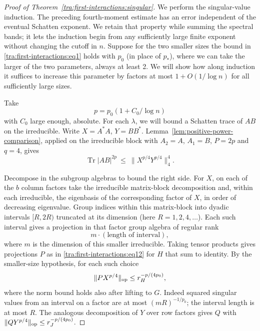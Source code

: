 \begin{proof}[Proof of Theorem~\ref{tra:first-interactions:singular}]

\label{tra:first-interactions:alt-and-dyadic-band-decay}
We perform the singular-value induction. The preceding fourth-moment estimate has an error independent of
the eventual Schatten exponent. We retain that property while summing
the spectral bands; it lets the induction begin from any sufficiently
large finite exponent without changing the cutoff in $n$. Suppose for the two smaller sizes the bound in \eqref{tra:first-interactions:eq1} holds with \(p_0\) (in place of \(p_*\)), where we can take the larger of the two parameters, always at least 2. We will show how along induction it suffices to increase this parameter by factors at most \(1+O(1/\log n)\) for all sufficiently large sizes.

Take
\[
                    p=p_0(1+C_0/\log n)
\]
with \(C_0\) large enough, absolute. For each \(\lambda\), we will bound a Schatten trace of \(A B\) on the irreducible. Write \(X=A^* A\), \(Y=B B^*\). Lemma~\ref{lem:positive-power-comparison}, applied on the
irreducible block with $A_2=A$, $A_1=B$, $P=2p$ and $q=4$, gives
\begin{equation}
                  \operatorname{Tr}|A B|^{2p}
                      \ \le\ \| X^{p/4} Y^{p/4}\|_4^4 .\label{tra:first-interactions:eq14}
\end{equation}

Decompose in the subgroup algebras to bound the right side. For \(X\), on each of the \(b\) column factors take the irreducible matrix-block decomposition and, within each irreducible, the eigenbasis of the corresponding factor of \(X\), in order of decreasing eigenvalue. Group indices within this matrix-block into dyadic intervals
\([R,2R)\) truncated at its dimension (here \(R=1,2,4,\ldots\)). Each such interval gives a projection in that factor group algebra of regular rank
\[
                              m \cdot (\text{length of interval}),
\]
where \(m\) is the dimension of this smaller irreducible. Taking tensor products gives projections \(P\) as in \eqref{tra:first-interactions:eq12} for \(H\) that sum to identity. By the smaller-size hypothesis, for each such choice
\begin{equation}
                          \|P X^{p/4}\|_{\rm op}
                                   \le r_H^{-p/(4p_0)},\label{tra:first-interactions:eq15}
\end{equation}
where the norm bound holds also after lifting to \(G\). Indeed squared singular values from an interval on a factor are at most \((m R)^{-1/p_0}\); the interval length is at most \(R\). The analogous decomposition of \(Y\) over row factors gives \(Q\) with \(\|Q Y^{p/4}\|_{\rm op}\le r_J^{-p/(4p_0)}\).


\end{proof}
